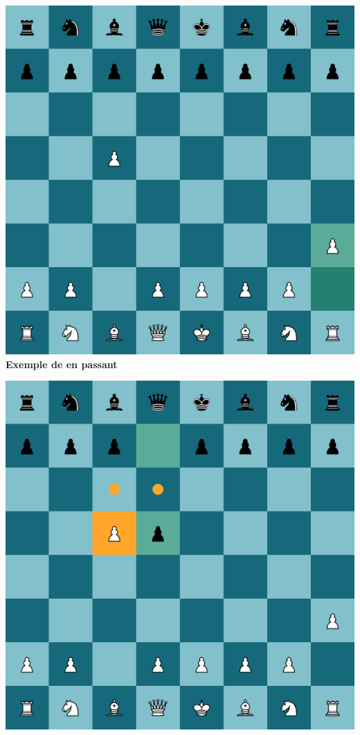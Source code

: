\documentclass{article}
\begin{document}
 \noindent
 \begin{minipage}{0.48\textwidth}
     \centering
     \includegraphics[width=\textwidth, height=\textwidth]{enpassant1.png}
     \vspace{0.5cm}
    \textbf{Exemple de en passant}
 \end{minipage}
 \hfill
 \begin{minipage}{0.48\textwidth}
     \centering
     \includegraphics[width=\textwidth, height=\textwidth]{enpassant2.png}
     \vspace{0.5cm}
 \end{minipage}
\end{document}
